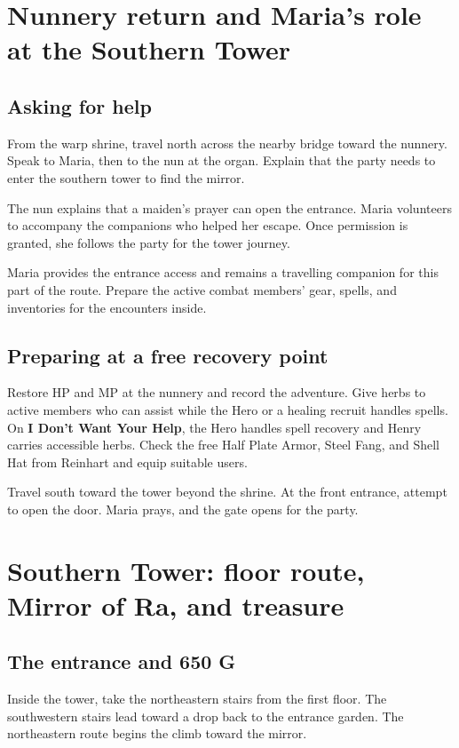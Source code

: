 \section{Nunnery return and Maria's role at the Southern Tower}

\subsection*{Asking for help}

From the warp shrine, travel north across the nearby bridge toward the
nunnery. Speak to Maria, then to the nun at the organ. Explain that
the party needs to enter the southern tower to find the mirror.

The nun explains that a maiden's prayer can open the entrance.
Maria volunteers to accompany the companions who helped her escape.
Once permission is granted, she follows the party for the tower journey.

Maria provides the entrance access and remains a travelling companion
for this part of the route. Prepare the active combat members' gear,
spells, and inventories for the encounters inside.

\subsection*{Preparing at a free recovery point}

Restore HP and MP at the nunnery and record the adventure. Give herbs
to active members who can assist while the Hero or a healing recruit
handles spells. On \textbf{I Don't Want Your Help}, the Hero handles
spell recovery and Henry carries accessible herbs. Check the free Half Plate Armor, Steel Fang, and Shell
Hat from Reinhart and equip suitable users.

Travel south toward the tower beyond the shrine. At the front entrance,
attempt to open the door. Maria prays, and the gate opens for the party.

\section{Southern Tower: floor route, Mirror of Ra, and treasure}

\subsection*{The entrance and 650 G}

Inside the tower, take the northeastern stairs from the first floor.
The southwestern stairs lead toward a drop back to the entrance garden.
The northeastern route begins the climb toward the mirror.

